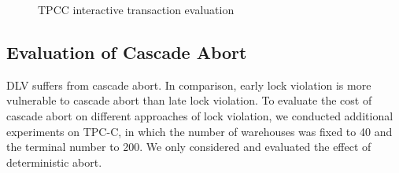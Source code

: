 \documentclass[conference]{IEEEtran}
\begin{document}
\begin{figure}[tbp]
  \centering

      \caption{TPCC interactive transaction evaluation}
      \label{fig:interactive_evaluation}
      \end{figure}


\subsection{Evaluation of Cascade Abort}
DLV suffers from cascade abort. In comparison, early lock violation is more vulnerable to cascade abort than
late lock violation.
To evaluate the cost of cascade abort on different approaches of lock violation, we conducted additional experiments on TPC-C, in which the number of warehouses was fixed to 40  and the terminal number to 200.
We only considered and evaluated the effect of deterministic abort.
\end{document}
